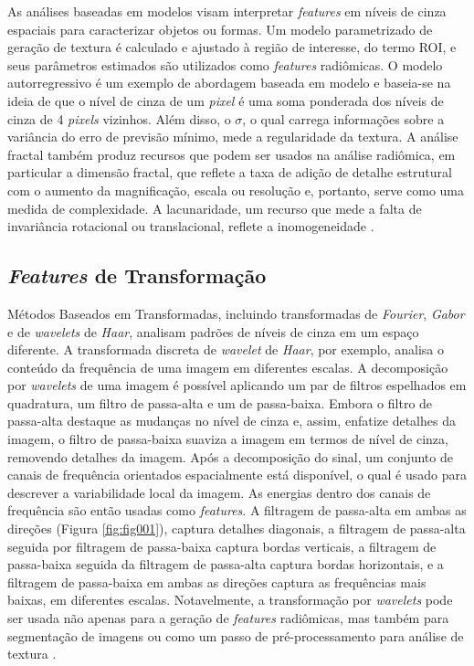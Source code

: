 As análises baseadas em modelos visam interpretar \textit{features} em níveis de cinza espaciais para caracterizar objetos ou formas. Um modelo parametrizado de geração de textura é calculado e ajustado à região de interesse, do termo \gls{ROI}, e seus parâmetros estimados são utilizados como \textit{features} radiômicas. O modelo autorregressivo é um exemplo de abordagem baseada em modelo e baseia-se na ideia de que o nível de cinza de um \textit{pixel} é uma soma ponderada dos níveis de cinza de 4 \textit{pixels} vizinhos. Além disso, o $\sigma$, o qual carrega informações sobre a variância do erro de previsão mínimo, mede a regularidade da textura. A análise fractal também produz recursos que podem ser usados na análise radiômica, em particular a dimensão fractal, que reflete a taxa de adição de detalhe estrutural com o aumento da magnificação, escala ou resolução e, portanto, serve como uma medida de complexidade. A lacunaridade, um recurso que mede a falta de invariância rotacional ou translacional, reflete a inomogeneidade \cite{mayerhoeferIntroductionRadiomics2020}.

\subsection{\textit{Features} de Transformação}
Métodos Baseados em Transformadas, incluindo transformadas de \textit{Fourier}, \textit{Gabor} e de \textit{wavelets} de \textit{Haar}, analisam padrões de níveis de cinza em um espaço diferente. A transformada discreta de \textit{wavelet} de \textit{Haar}, por exemplo, analisa o conteúdo da frequência de uma imagem em diferentes escalas. A decomposição por \textit{wavelets} de uma imagem é possível aplicando um par de filtros espelhados em quadratura, um filtro de passa-alta e um de passa-baixa. Embora o filtro de passa-alta destaque as mudanças no nível de cinza e, assim, enfatize detalhes da imagem, o filtro de passa-baixa suaviza a imagem em termos de nível de cinza, removendo detalhes da imagem. Após a decomposição do sinal, um conjunto de canais de frequência orientados espacialmente está disponível, o qual é usado para descrever a variabilidade local da imagem. As energias dentro dos canais de frequência são então usadas como \textit{features}. A filtragem de passa-alta em ambas as direções (Figura \ref{fig:fig001}), captura detalhes diagonais, a filtragem de passa-alta seguida por filtragem de passa-baixa captura bordas verticais, a filtragem de passa-baixa seguida da filtragem de passa-alta captura bordas horizontais, e a filtragem de passa-baixa em ambas as direções captura as frequências mais baixas, em diferentes escalas. Notavelmente, a transformação por \textit{wavelets} pode ser usada não apenas para a geração de \textit{features} radiômicas, mas também para segmentação de imagens ou como um passo de pré-processamento para análise de textura \cite{mayerhoeferIntroductionRadiomics2020}.

